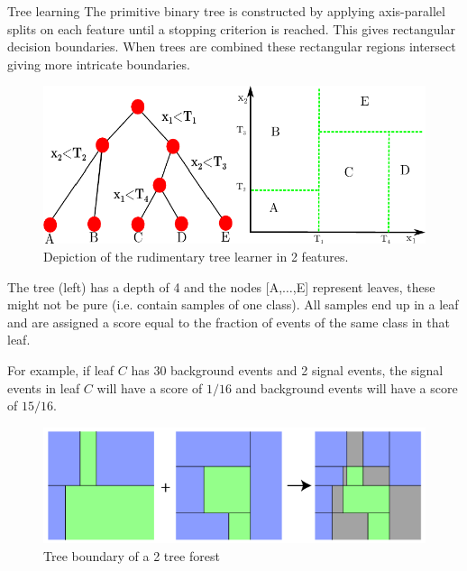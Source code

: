\documentclass[final]{beamer}
\begin{document}
\begin{frame}{}
\begin{textblock}{20.0}
\begin{block}{Tree learning}
The primitive binary tree is constructed by applying axis-parallel splits on each feature until a stopping criterion is reached. This gives rectangular decision boundaries. When trees are combined these rectangular regions intersect giving more intricate boundaries.\\ \vspace{0.1cm}
\begin{minipage}{0.60\textwidth}
\begin{figure}
\includegraphics[width=\textwidth]{tree_learner.png}
\caption{\tiny{Depiction of the rudimentary tree learner in 2 features.}}
\end{figure}
\end{minipage}
\begin{minipage}{0.36\linewidth} \raggedright
The tree (left) has a depth of 4 and the nodes [A,$\ldots$,E] represent leaves, these might not be pure (i.e. contain samples of one class). All samples end up in a leaf and are assigned a score equal to the fraction of events of the same class in that leaf. 
\end{minipage} 

\begin{minipage}{0.36\linewidth} \raggedright
For example, if leaf $C$ has 30 background events and 2 signal events, the signal events in leaf $C$ will have a score of $1/16$ and background events will have a score of $15/16$. 
\end{minipage}
\begin{minipage}{0.6\linewidth}
\begin{figure}
\includegraphics[width=\textwidth]{tree_boundary.png}
\caption{\tiny{Tree boundary of a 2 tree forest}}
\end{figure}
\end{minipage}


\end{block}
\end{textblock}
\end{frame}
\end{document}
